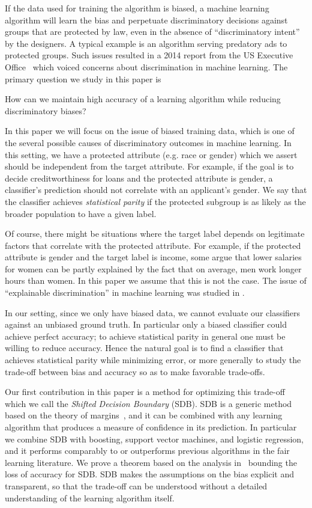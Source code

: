 \documentclass[twoside,leqno,twocolumn]{article}
\begin{document}
If the data used for training the algorithm is biased, a machine learning
algorithm will learn the bias and perpetuate discriminatory decisions against
groups that are protected by law, even in the absence of ``discriminatory
intent'' by the designers. A typical example is an algorithm serving predatory
ads to protected groups. Such issues resulted in a 2014 report from the US
Executive Office~\cite{PodestaPMHZ14} which voiced concerns about
discrimination in machine learning. The primary question we study in this paper
is
\begin{center}
How can we maintain high accuracy of a learning algorithm while reducing
discriminatory biases?
\end{center}
In this paper we will focus on the issue of biased training data, which is one
of the several possible causes of discriminatory outcomes in machine learning.
In this setting, we have a protected attribute (e.g. race or gender) which we
assert should be independent from the target attribute.  For example, if the
goal is to decide creditworthiness for loans and the protected attribute is
gender, a classifier's prediction should not correlate with an applicant's
gender. We say that the classifier achieves \emph{statistical parity} if the
protected subgroup is as likely as the broader population to have a given
label.

Of course, there might be situations where the target label depends on
legitimate factors that correlate with the protected attribute. For example,
if the protected attribute is gender and the target label is income, some argue
that lower salaries for women can be partly explained by the fact that on
average, men work longer hours than women. In this paper we assume that this
is not the case. The issue of ``explainable discrimination'' in machine
learning was studied in \cite{KamiranZC13}.

In our setting, since we only have biased data, we cannot evaluate our
classifiers against an unbiased ground truth. In particular only a biased
classifier could achieve perfect accuracy; to achieve statistical parity in
general one must be willing to reduce accuracy. Hence the natural goal is to
find a classifier that achieves statistical parity while minimizing error, or
more generally to study the trade-off between bias and accuracy so as to make
favorable trade-offs.

Our first contribution in this paper is a method for optimizing this trade-off
which we call the \emph{Shifted Decision Boundary} (SDB). SDB is a generic
method based on the theory of margins~\cite{SchapireFBL98,CortesV95}, and it
can be combined with any learning algorithm that produces a measure of
confidence in its prediction. In particular we combine SDB with boosting,
support vector machines, and logistic regression, and it performs comparably to
or outperforms previous algorithms in the fair learning literature. We prove a
theorem based on the analysis in~\cite{SchapireFBL98} bounding the loss of
accuracy for SDB. SDB makes the assumptions on the bias explicit and
transparent, so that the trade-off can be understood without a detailed
understanding of the learning algorithm itself. 
\end{document}
